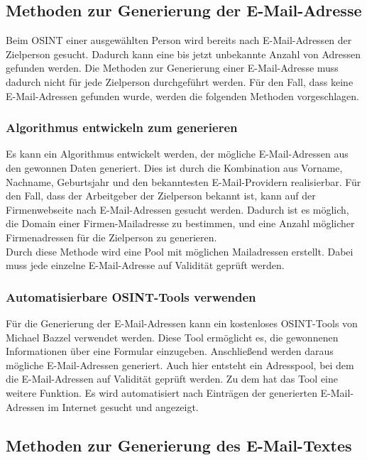 	\subsection{Methoden zur Generierung der E-Mail-Adresse}
	
	Beim OSINT einer ausgewählten Person wird bereits nach E-Mail-Adressen der Zielperson gesucht. Dadurch kann eine bis jetzt unbekannte Anzahl von Adressen gefunden werden. Die Methoden zur Generierung einer E-Mail-Adresse muss dadurch nicht für jede Zielperson durchgeführt werden. Für den Fall, dass keine E-Mail-Adressen gefunden wurde, werden die folgenden Methoden vorgeschlagen.
	
		\subsubsection{Algorithmus entwickeln zum generieren}
		Es kann ein Algorithmus entwickelt werden, der mögliche E-Mail-Adressen aus den gewonnen Daten generiert. Dies ist durch die Kombination aus Vorname, Nachname, Geburtsjahr und den bekanntesten E-Mail-Providern realisierbar. Für den Fall, dass der Arbeitgeber der Zielperson bekannt ist, kann auf der Firmenwebseite nach E-Mail-Adressen gesucht werden. Dadurch ist es möglich, die Domain einer Firmen-Mailadresse zu bestimmen, und eine Anzahl möglicher Firmenadressen für die Zielperson zu generieren.\\
		Durch diese Methode wird eine Pool mit möglichen Mailadressen erstellt. Dabei muss jede einzelne E-Mail-Adresse auf Validität geprüft werden.

		
		\subsubsection{Automatisierbare OSINT-Tools verwenden}
		Für die Generierung der E-Mail-Adressen kann ein kostenloses OSINT-Tools von Michael Bazzel verwendet werden. Diese Tool ermöglicht es, die gewonnenen Informationen über eine Formular einzugeben. Anschließend werden daraus mögliche E-Mail-Adressen generiert. Auch hier entsteht ein Adresspool, bei dem die E-Mail-Adressen auf Validität geprüft werden. Zu dem hat das Tool eine weitere Funktion. Es wird automatisiert nach Einträgen der generierten E-Mail-Adressen im Internet gesucht und angezeigt. \cite{EmailAssumptions}
		
	\subsection{Methoden zur Generierung des E-Mail-Textes}
